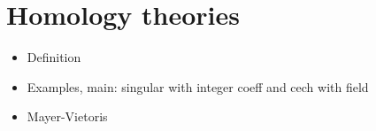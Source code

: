 
\section{Homology theories} \label{s:homology}

\begin{itemize}
	\item Definition
	\item Examples, main: singular with integer coeff and cech with field 
	\item Mayer-Vietoris
\end{itemize}